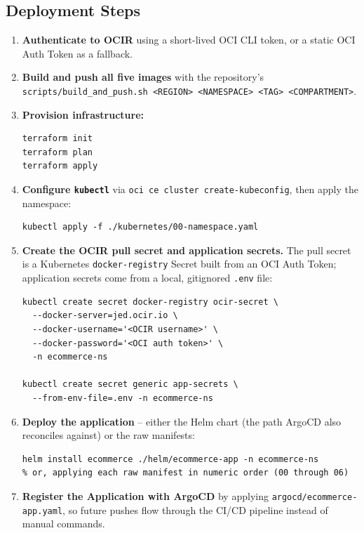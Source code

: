 \subsection*{Deployment Steps}
\begin{enumerate}[leftmargin=1.4em]
  \item \textbf{Authenticate to OCIR} using a short-lived OCI CLI token, or a static
        OCI Auth Token as a fallback.
  \item \textbf{Build and push all five images} with the repository's
        \texttt{scripts/build\_and\_push.sh <REGION> <NAMESPACE> <TAG> <COMPARTMENT>}.
  \item \textbf{Provision infrastructure:}
\begin{lstlisting}[style=shellstyle]
terraform init
terraform plan
terraform apply
\end{lstlisting}
  \item \textbf{Configure \texttt{kubectl}} via
        \texttt{oci ce cluster create-kubeconfig}, then apply the namespace:
\begin{lstlisting}[style=shellstyle]
kubectl apply -f ./kubernetes/00-namespace.yaml
\end{lstlisting}
  \item \textbf{Create the OCIR pull secret and application secrets.} The pull
        secret is a Kubernetes \texttt{docker-registry} Secret built from an OCI
        Auth Token; application secrets come from a local, gitignored \texttt{.env}
        file:
\begin{lstlisting}[style=shellstyle]
kubectl create secret docker-registry ocir-secret \
  --docker-server=jed.ocir.io \
  --docker-username='<OCIR username>' \
  --docker-password='<OCI auth token>' \
  -n ecommerce-ns

kubectl create secret generic app-secrets \
  --from-env-file=.env -n ecommerce-ns
\end{lstlisting}
  \item \textbf{Deploy the application} -- either the Helm chart (the path ArgoCD
        also reconciles against) or the raw manifests:
\begin{lstlisting}[style=shellstyle]
helm install ecommerce ./helm/ecommerce-app -n ecommerce-ns
% or, applying each raw manifest in numeric order (00 through 06)
\end{lstlisting}
  \item \textbf{Register the Application with ArgoCD} by applying
        \texttt{argocd/ecommerce-app.yaml}, so future pushes flow through the CI/CD
        pipeline instead of manual commands.
\end{enumerate}

